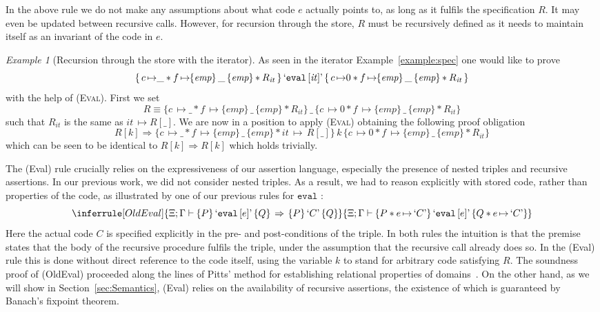 \documentclass{LMCS}
\theoremstyle{remark}
\newtheorem{example}[theorem]{Example}
\newcommand{\QUOTE}[1]{\textnormal{`\ensuremath{#1}'}}
\newcommand{\UNQUOTE}[1]{\SYN{eval}\,{#1}}
\newcommand{\SYN}[1]{\ensuremath{\texttt{#1}}}
\newcommand{\triple}[3]{{\ensuremath{\!\left.\{ #1 \}\, #2\, \{  #3 \}\!\right.}}}
\newcommand{\pointsto}{\ensuremath{\mapsto}}
\newcommand{\EMP}{\ensuremath{\textit{emp}}}
\newcommand{\X}{\ensuremath{\Xi}}
\begin{document}
In the above rule we do not make any assumptions about what code $e$ actually
points to, as long as it fulfils the specification $R$. It may even be updated between recursive calls.  However, for recursion through the store, $R$ must be recursively defined as it needs to maintain itself as an invariant of the code in $e$.

\begin{example}[Recursion through the store with the iterator]\label{example:eval}
As seen in the iterator Example~\ref{example:spec} one would like to prove
$$
\triple{\, c\,{\pointsto}\_ * f\,{\pointsto}\triple{\EMP}{\_}{\EMP} *R_{\mathit{it}}\, }
{ \QUOTE{\UNQUOTE{[\mathit{it}]}}}{\,c\, {\pointsto}0 * f\,{\pointsto} \triple{\EMP}{\_}{\EMP} * R_{\mathit{it}} \, }
$$
with the help of \textsc{(Eval)}. First we set 
$$R  \equiv 
 \triple{c\,{\pointsto}\_ * f\,{\pointsto}\triple{\EMP}{\_}{\EMP} * R_{\mathit{it}}}
 {\_}
{c\,{\pointsto}0 * f\,{\pointsto}\triple{\EMP}{\_}{\EMP} * R_{\mathit{it}}}
$$
such that $R_{\mathit{it}}$ is the same as $\mathit{it}\,{\pointsto}R[\_]$. We are now in a position to  apply \textsc{(Eval)} obtaining the following proof obligation 
$$ R[k] \Rightarrow \triple{ c\,{\pointsto}\_ * f\,{\pointsto}\triple{\EMP}{\_}{\EMP} * \mathit{it}\,{\pointsto}\,R[\_]}{k}
{c\, {\pointsto}0 * f\,{\pointsto} \triple{\EMP}{\_}{\EMP} * R_{\mathit{it}} }
$$
which can be seen to be identical to $R[k] \Rightarrow R[k]$ which holds trivially.
\end{example}

The ({\sc Eval}) rule crucially relies on the expressiveness of
our assertion language, especially the presence of nested triples
and recursive assertions. In our previous work, we did not consider nested 
triples. As a result, we had to reason explicitly with stored code,
rather than properties of the code, as illustrated by one of our previous rules
for $\SYN{eval}$ \cite{Birkedal:Reus:Schwinghammer:Yang:08}:
$$
\inferrule[OldEval]{
  \X;\Gamma \adash
  \triple{P}{\QUOTE{\UNQUOTE [e]}}{Q} \,\Rightarrow\, \triple{P}{\QUOTE{C}}{Q}
}{
  \X;\Gamma\vdash
  \triple{P*e\,{\mapsto}\, {\QUOTE C}}{\QUOTE{\UNQUOTE [e]}}{Q * e\,{\mapsto}\,{\QUOTE C}}
}
$$
Here the actual code $C$ is specified explicitly in the pre- and post-conditions of the triple.
In both rules the intuition is that the premise states
that the body of the recursive procedure fulfils the triple, under the assumption that the recursive call already does so. 
In the ({\sc Eval}) rule this is done without direct reference to the code itself, using the variable $k$ to stand for arbitrary code satisfying $R$.
The soundness proof of ({\sc OldEval}) proceeded along the lines of Pitts' method for establishing relational properties of domains~\cite{Pitts:96}.
On the other hand, as we will show in Section~\ref{sec:Semantics}, ({\sc Eval}) relies on the availability of recursive assertions,
the existence of which is guaranteed by Banach's fixpoint theorem.
\end{document}
